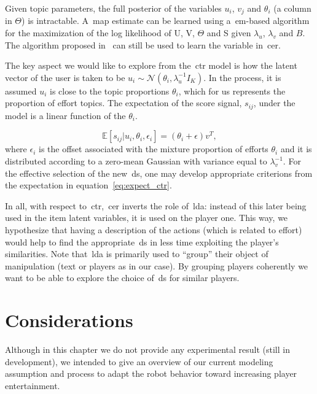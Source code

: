 Given topic parameters, the full posterior of the variables $u_{i}$, $v_{j}$ and $\theta_{i}$ (a column in $\Theta$) is intractable. A~\gls{map} estimate can be learned using a~\gls{em}-based algorithm for the maximization of the log likelihood of U, V, $\Theta$ and S given $\lambda_{u}$, $\lambda_{v}$ and $B$. The algorithm proposed in~\cite{wang_collaborative_2011} can still be used to learn the variable in~\gls{cer}. 

The key aspect we would like to explore from the~\gls{ctr} model is how the latent vector of the user is taken to be $u_{i} \sim \mathcal{N}(\theta_{i}, \lambda_{u}^{-1}I_{K})$.
In the process, it is assumed $u_{i}$ is close to the topic proportions $\theta_{i}$, which for us represents the proportion of effort topics. The expectation of the score signal, $s_{ij}$, under the model is a linear function of the $\theta_{i}$.

\begin{equation}
    \mathbb{E}[s_{ij}|u_{i}, \theta_{i}, \epsilon_{i}] = (\theta_{i} + \epsilon)v^{T},
    \label{eq:expect_ctr}
\end{equation}
where $\epsilon_{i}$ is the offset associated with the mixture proportion of efforts $\theta_{i}$ and it is distributed according to a zero-mean Gaussian with variance equal to $\lambda_{v}^{-1}$. For the effective selection of the new~\gls{ds}, one may develop appropriate criterions from the expectation in equation~\ref{eq:expect_ctr}.

In all, with respect to~\gls{ctr},~\gls{cer} inverts the role of~\gls{lda}: instead of this later being used in the item latent variables, it is used on the player one. This way, we hypothesize that having a description of the actions (which is related to effort) would help to find the appropriate~\gls{ds} in less time exploiting the player's similarities. Note that~\gls{lda} is primarily used to ``group'' their object of manipulation (text or players as in our case). By grouping players coherently we want to be able to explore the choice of~\gls{ds} for similar players. 


\section{Considerations}
Although in this chapter we do not provide any experimental result (still in development), we intended to give an overview of our current modeling assumption and process to adapt the robot behavior toward increasing player entertainment.

